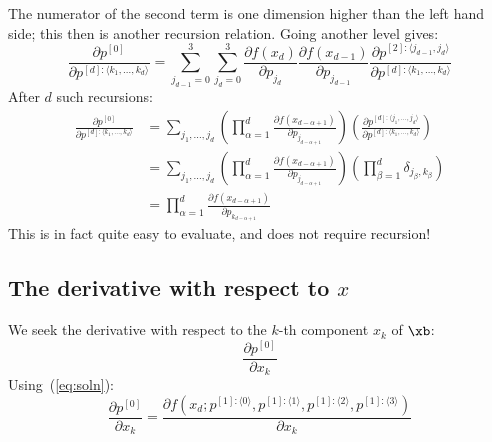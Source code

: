 \documentclass[11pt]{article}
\begin{document}
The numerator of the second term is one dimension higher than the left hand side; this then is another recursion relation. Going another level gives:
\begin{equation}
\frac{\partial p^{[0]}}{\partial p^{[d]: \langle k_1, \dots, k_d \rangle}}
=
\sum_{j_{d-1}=0}^3
\sum_{j_d=0}^3
\frac{ 
\partial f(x_d)
}{
\partial p_{j_d}
}
\frac{ 
\partial f(x_{d-1})
}{
\partial p_{j_{d-1}}
}
\frac{
\partial p^{[2]: \langle j_{d-1}, j_d \rangle}
}{
\partial p^{[d]: \langle k_1, \dots, k_d \rangle}
}
\end{equation}
After $d$ such recursions:
\begin{equation}
\begin{split}
\frac{\partial p^{[0]}}{\partial p^{[d]: \langle k_1, \dots, k_d \rangle}}
&=
\sum_{j_1,\dots,j_d} 
\left (
\prod_{\alpha=1}^{d} 
\frac{ 
\partial f(x_{d-\alpha+1})
}{
\partial p_{j_{d-\alpha+1}}
}
\right ) 
\left (
\frac{
\partial p^{[d]: \langle j_1,\dots,j_d \rangle}
}{
\partial p^{[d]: \langle k_1, \dots, k_d \rangle}
}
\right ) \\
&=
\sum_{j_1,\dots,j_d} 
\left (
\prod_{\alpha=1}^{d} 
\frac{ 
\partial f(x_{d-\alpha+1})
}{
\partial p_{j_{d-\alpha+1}}
}
\right ) 
\left (
\prod_{\beta=1}^d \delta_{j_\beta, k_\beta}
\right ) \\
&=
\prod_{\alpha=1}^{d} 
\frac{ 
\partial f(x_{d-\alpha+1})
}{
\partial p_{k_{d-\alpha+1}}
}
\end{split}
\end{equation}
This is in fact quite easy to evaluate, and does not require recursion!


\subsection{The derivative with respect to $x$}


We seek the derivative with respect to the $k$-th component $x_k$ of $\xb$:
\begin{equation}
\frac{\partial p^{[0]}}{\partial x_k}
\end{equation}
Using~(\ref{eq:soln}):
\begin{equation}
\frac{\partial p^{[0]}}{\partial x_k}
=
\frac{\partial f \left ( 
x_d ; 
p^{[1]: \langle 0 \rangle},
p^{[1]: \langle 1 \rangle},
p^{[1]: \langle 2 \rangle},
p^{[1]: \langle 3 \rangle}
\right )
}{
\partial x_k
}
\end{equation}
\end{document}
